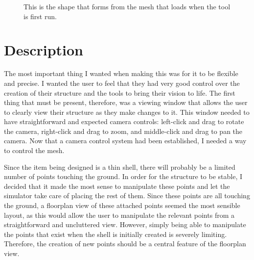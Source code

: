 \documentclass{thesis}
\begin{document}
\begin{figure}
\caption[The basic shell]{This is the shape that forms from the mesh that loads when the tool is first run.}
\label{fig:basic}
\end{figure}

\section{Description}
The most important thing I wanted when making this was for it to be flexible and precise.  I wanted the user to feel that they
had very good control over the creation of their structure and the tools to bring their vision to life.  The first thing that must
be present, therefore, was a viewing window that allows the user to clearly view their structure as they make changes to it.
This window needed to have straightforward and expected camera controls: left-click and drag to rotate the camera, right-click and
drag to zoom, and middle-click and drag to pan the camera.  Now that a camera control system had been established, I needed a way
to control the mesh.

Since the item being designed is a thin shell, there will probably be a limited number of points touching the ground.  In order
for the structure to be stable, I decided that it made the most sense to manipulate these points and let the simulator take care
of placing the rest of them.  Since these points are all touching the ground, a floorplan view of these attached points seemed the
most sensible layout, as this would allow the user to manipulate the relevant points from a straightforward and uncluttered view.
However, simply being able to manipulate the points that exist when the shell is initially created is severely limiting.  Therefore,
the creation of new points should be a central feature of the floorplan view.
\end{document}
